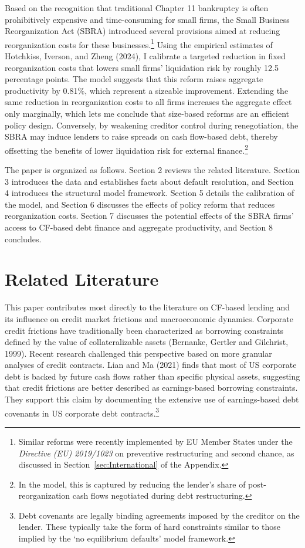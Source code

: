 \documentclass[12pt]{article}
\begin{document}
Based on the recognition that traditional Chapter 11 bankruptcy is often prohibitively expensive and time-consuming for small firms, the Small Business Reorganization Act (SBRA) introduced several provisions aimed at reducing reorganization costs for these businesses.\footnote{Similar reforms were recently implemented by EU Member States under the \textit{Directive (EU) 2019/1023} on preventive restructuring and second chance, as discussed in Section~\ref{sec:International} of the Appendix.} Using the empirical estimates of Hotchkiss, Iverson, and Zheng (2024), I calibrate a targeted reduction in fixed reorganization costs that lowers small firms' liquidation risk by roughly 12.5 percentage points. The model suggests that this reform raises aggregate productivity by 0.81\%, which represent a sizeable improvement. Extending the same reduction in reorganization costs to all firms increases the aggregate effect only marginally, which lets me conclude that size-based reforms are an efficient policy design. Conversely, by weakening creditor control during renegotiation, the SBRA may induce lenders to raise spreads on cash flow-based debt, thereby offsetting the benefits of lower liquidation risk for external finance.\footnote{In the model, this is captured by reducing the lender's share of post-reorganization cash flows negotiated during debt restructuring.}

The paper is organized as follows. Section 2 reviews the related literature. Section 3 introduces the data and establishes facts about default resolution, and Section 4 introduces the structural model framework. Section 5 details the calibration of the model, and Section 6 discusses the effects of policy reform that reduces reorganization costs. Section 7 discusses the potential effects of the SBRA firms' access to CF-based debt finance  and aggregate productivity, and Section 8 concludes.

\section{Related Literature \label{sec:literature}}
This paper contributes most directly to the literature on CF-based lending and its influence on credit market frictions and macroeconomic dynamics. Corporate credit frictions have traditionally been characterized as borrowing constraints defined by the value of collateralizable assets (Bernanke, Gertler and Gilchrist, 1999). Recent research challenged this perspective based on more granular analyses of credit contracts. Lian and Ma (2021) finds that most of US corporate debt is backed by future cash flows rather than specific physical assets, suggesting that credit frictions are better described as earnings-based borrowing constraints. They support this claim by documenting the extensive use of earnings-based debt covenants in US corporate debt contracts.\footnote{Debt covenants are legally binding agreements imposed by the creditor on the lender. These typically take the form of hard constraints similar to those implied by the `no equilibrium defaults' model framework.} 
\end{document}

